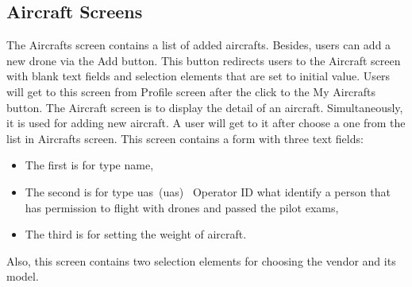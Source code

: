 \subsection{Aircraft Screens}\label{subsec:aircraft-screens}
The Aircrafts screen contains a list of added aircrafts.
Besides, users can add a new drone via the Add button.
This button redirects users to the Aircraft screen with blank text fields and selection elements that are set to initial value.
Users will get to this screen from Profile screen after the click to the My Aircrafts button.
\newpage
The Aircraft screen is to display the detail of an aircraft.
Simultaneously, it is used for adding new aircraft.
A user will get to it after choose a one from the list in Aircrafts screen.
This screen contains a form with three text fields:
\begin{itemize}
    \item The first is for type name,
    \item The second is for type \acrshort{uas}~(\acrlong{uas})~\cite{uas} Operator ID what identify a person that has permission to flight with drones and passed the pilot exams,
    \item The third is for setting the weight of aircraft.
\end{itemize}

Also, this screen contains two selection elements for choosing the vendor and its model.
